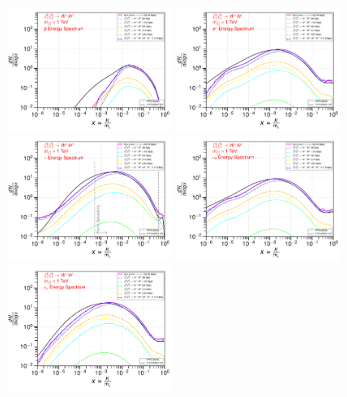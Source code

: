 \documentclass[epj,nopacs,fleqn]{svjour}
\begin{document}
\begin{figure}[!h]
	\centering
	\subfigure
	{ \includegraphics[width=0.48\textwidth]{Fig/n1ww_comparison/1000.0_antiprotons_n1ww_comparison_1000.0.pdf} } 
	\subfigure
	{\includegraphics[width=0.48\textwidth]{Fig/n1ww_comparison/1000.0_positrons_n1ww_comparison_1000.0.pdf} }
	\subfigure
	{\includegraphics[width=0.48\textwidth]{Fig/n1ww_comparison/1000.0_gammas_n1ww_comparison_1000.0.pdf} }
	\subfigure
	{\includegraphics[width=0.48\textwidth]{Fig/n1ww_comparison/1000.0_neutrinos_e_n1ww_comparison_1000.0.pdf} }
	\subfigure
	{\includegraphics[width=0.48\textwidth]{Fig/n1ww_comparison/1000.0_neutrinos_mu_n1ww_comparison_1000.0.pdf} }

\end{figure}
\end{document}
